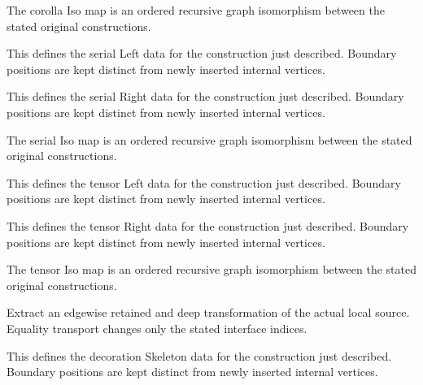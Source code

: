 The corolla Iso map is an ordered recursive graph isomorphism between the stated original constructions.
\par{}

This defines the serial Left data for the construction just described. Boundary positions are kept distinct from newly inserted internal vertices.
\par{}

This defines the serial Right data for the construction just described. Boundary positions are kept distinct from newly inserted internal vertices.
\par{}

The serial Iso map is an ordered recursive graph isomorphism between the stated original constructions.
\par{}

This defines the tensor Left data for the construction just described. Boundary positions are kept distinct from newly inserted internal vertices.
\par{}

This defines the tensor Right data for the construction just described. Boundary positions are kept distinct from newly inserted internal vertices.
\par{}

The tensor Iso map is an ordered recursive graph isomorphism between the stated original constructions.
\par{}

Extract an edgewise retained and deep transformation of the actual local source. Equality transport changes only the stated interface indices.
\par{}

This defines the decoration Skeleton data for the construction just described. Boundary positions are kept distinct from newly inserted internal vertices.
\par{}

